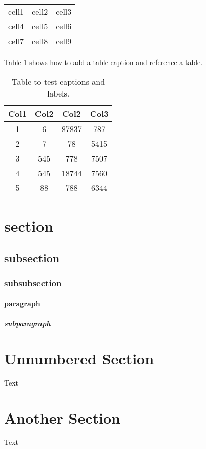 \documentclass[12pt, a4paper]{article} %
\begin{document}
    \begin{center}
        \begin{tabular}{c c c}       %
            cell1 & cell2 & cell3 \\ %
            cell4 & cell5 & cell6 \\
            cell7 & cell8 & cell9
        \end{tabular}
    \end{center}

    Table \ref{table:data} shows how to add a table caption and reference a table.

    \begin{table}[h!]
        \centering
        \begin{tabular}{||c|c|c|c||}             %
            \hline                               %
            Col1 & Col2 & Col2 & Col3 \\ [0.5ex]
            \hline\hline
            1 & 6 & 87837 & 787 \\
            \hline
            2 & 7 & 78 & 5415 \\
            \hline
            3 & 545 & 778 & 7507 \\
            \hline
            4 & 545 & 18744 & 7560 \\
            \hline
            5 & 88 & 788 & 6344 \\ [1ex]
            \hline
        \end{tabular}
        \caption{Table to test captions and labels.}
        \label{table:data}
    \end{table}

    \section{section}
        \subsection{subsection}
            \subsubsection{subsubsection}
                \paragraph{paragraph}
                    \subparagraph{subparagraph}

    \section*{Unnumbered Section}
       Text

    \section{Another Section}
        Text
\end{document}
